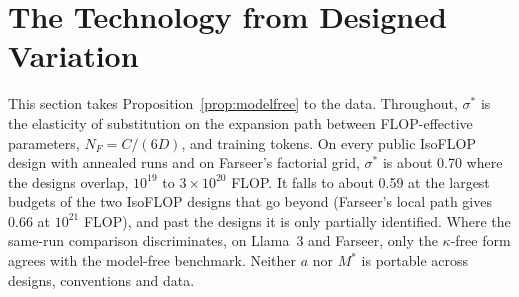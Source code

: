 
\section{The Technology from Designed Variation}\label{sec:tech}

This section takes Proposition~\ref{prop:modelfree} to the data. Throughout, $\sigma^*$ is the elasticity of
substitution on the expansion path between FLOP-effective parameters, $N_F=C/(6D)$, and training tokens. On every
public IsoFLOP design with annealed runs and on Farseer's factorial grid, $\sigma^*$ is about 0.70 where the designs
overlap, $10^{19}$ to $3\times10^{20}$ FLOP. It falls to about 0.59 at the largest budgets of the two IsoFLOP designs
that go beyond (Farseer's local path gives 0.66 at $10^{21}$ FLOP), and past the designs it is only partially
identified. Where the same-run comparison discriminates, on Llama~3 and Farseer, only the $\kappa$-free form agrees with
the model-free benchmark. Neither $a$ nor $M^*$ is portable across designs, conventions and data.


